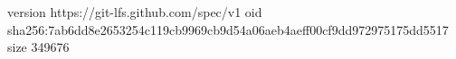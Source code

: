 version https://git-lfs.github.com/spec/v1
oid sha256:7ab6dd8e2653254c119cb9969cb9d54a06aeb4aeff00cf9dd972975175dd5517
size 349676
